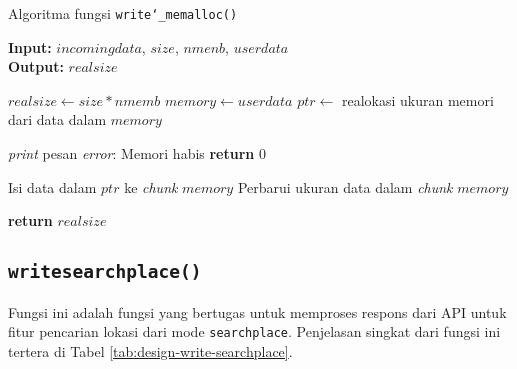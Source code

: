 \begin{algorithm}[h]
	\caption{\textendash\xspace Algoritma fungsi \texttt{write\char`_memalloc()}}
	\label{alg:design-write-memalloc}
	\vspace{-0.6\baselineskip}
	\begin{flushleft}
		\textbf{Input:} $incomingdata$, $size$, $nmenb$, $userdata$ \\
		\textbf{Output:} $realsize$ \\
	\end{flushleft}
	\vspace{-1.05\baselineskip}
	\begin{algorithmic}
		\State $realsize \gets size * nmemb$  
		\State $memory \gets userdata$ 
		\State $ptr \gets$ realokasi ukuran memori dari data dalam $memory$
		
		 
			\State \textit{print} pesan \textit{error}: Memori habis
			\State \textbf{return} $0$ 
		\EndIf
		
		\State Isi data dalam $ptr$ ke \textit{chunk} $memory$
		\State Perbarui ukuran data dalam \textit{chunk} $memory$
		
		\State \textbf{return} $realsize$ 
	\end{algorithmic}
\end{algorithm}

\subsection{\texttt{write\textunderscore searchplace()}}
\label{sec:design-code-write-searchplace}

Fungsi ini adalah fungsi yang bertugas untuk memproses respons dari API untuk fitur pencarian lokasi dari mode \verb|searchplace|. Penjelasan singkat dari fungsi ini tertera di Tabel \ref{tab:design-write-searchplace}.

